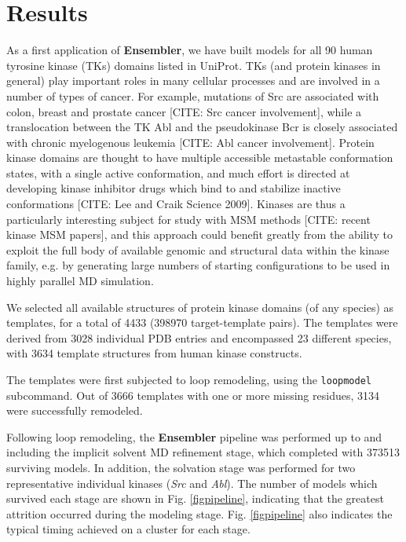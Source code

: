 \documentclass[aps,pre,twocolumn,nofootinbib,superscriptaddress,linenumbers]{revtex4-1}
\begin{document}
\label{section:design}

\section{Results}
\label{section:results}

As a first application of {\bf Ensembler}, we have built models for all 90 human tyrosine kinase (TKs) domains listed in UniProt.
TKs (and protein kinases in general) play important roles in many cellular processes and are involved in a number of types of cancer.
For example, mutations of Src are associated with colon, breast and prostate cancer {\color{red}[CITE: Src cancer involvement]}, while a translocation between the TK Abl and the pseudokinase Bcr is closely associated with chronic myelogenous leukemia {\color{red}[CITE: Abl cancer involvement]}.
Protein kinase domains are thought to have multiple accessible metastable conformation states, with a single active conformation, and much effort is directed at developing kinase inhibitor drugs which bind to and stabilize inactive conformations [CITE: Lee and Craik Science 2009].
Kinases are thus a particularly interesting subject for study with MSM methods [CITE: recent kinase MSM papers], and this approach could benefit greatly from the ability to exploit the full body of available genomic and structural data within the kinase family, e.g. by generating large numbers of starting configurations to be used in highly parallel MD simulation.

We selected all available structures of protein kinase domains (of any species) as templates, for a total of 4433 (\num{398970} target-template pairs).
The templates were derived from 3028 individual PDB entries and encompassed 23 different species, with 3634 template structures from human kinase constructs.

The templates were first subjected to loop remodeling, using the {\tt loopmodel} subcommand.
Out of 3666 templates with one or more missing residues, 3134 were successfully remodeled.

Following loop remodeling, the {\bf Ensembler} pipeline was performed up to and including the implicit solvent MD refinement stage, which completed with \num{373513} surviving models.
In addition, the solvation stage was performed for two representative individual kinases (\emph{Src} and \emph{Abl}).
The number of models which survived each stage are shown in Fig. \ref{figpipeline}, indicating that the greatest attrition occurred during the modeling stage.
Fig. \ref{figpipeline} also indicates the typical timing achieved on a cluster for each stage.
\end{document}
